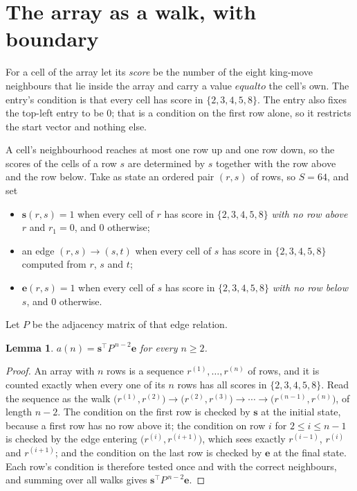 \documentclass[11pt,a4paper]{article}
\theoremstyle{plain}
\newtheorem{lemma}[theorem]{Lemma}
\theoremstyle{definition}
\begin{document}
\section{The array as a walk, with boundary}

For a cell of the array let its \emph{score} be the number of the eight king-move neighbours that lie inside
the array and carry a value $equal to$ the cell's own. The entry's condition is that every cell
has score in $\{2,3,4,5,8\}$. The entry also fixes the top-left entry to be $0$; that is a condition on the first row alone, so it restricts the start vector and nothing else.

A cell's neighbourhood reaches at most one row up and one row down, so the scores of the
cells of a row $s$ are determined by $s$ together with the row above and the row below.
Take as state an ordered pair $(r,s)$ of rows, so $S=64$, and set
\begin{itemize}
\item $\mathbf{s}(r,s)=1$ when every cell of $r$ has score in $\{2,3,4,5,8\}$ \emph{with no row
above $r$} and $r_1=0$, and $0$ otherwise;
\item an edge $(r,s)\to(s,t)$ when every cell of $s$ has score in $\{2,3,4,5,8\}$ computed from
$r$, $s$ and $t$;
\item $\mathbf{e}(r,s)=1$ when every cell of $s$ has score in $\{2,3,4,5,8\}$ \emph{with no row
below $s$}, and $0$ otherwise.
\end{itemize}
Let $P$ be the adjacency matrix of that edge relation.

\begin{lemma}\label{lem:walk}
$a(n)=\mathbf{s}^{\!\top}P^{\,n-2}\mathbf{e}$ for every $n\ge2$.
\end{lemma}

\begin{proof}
An array with $n$ rows is a sequence $r^{(1)},\dots,r^{(n)}$ of rows, and it is counted
exactly when every one of its $n$ rows has all scores in $\{2,3,4,5,8\}$. Read the sequence as the
walk $\bigl(r^{(1)},r^{(2)}\bigr)\to\bigl(r^{(2)},r^{(3)}\bigr)\to\cdots\to
\bigl(r^{(n-1)},r^{(n)}\bigr)$, of length $n-2$. The condition on the first row is
checked by $\mathbf{s}$ at the initial state, because a first row has no row above it; the
condition on row $i$ for $2\le i\le n-1$ is checked by the edge entering
$\bigl(r^{(i)},r^{(i+1)}\bigr)$, which sees exactly $r^{(i-1)}$, $r^{(i)}$ and
$r^{(i+1)}$; and the condition on the last row is checked by $\mathbf{e}$ at the final
state. Each row's condition is therefore tested once and with the correct neighbours, and
summing over all walks gives $\mathbf{s}^{\!\top}P^{\,n-2}\mathbf{e}$.
\end{proof}
\end{document}
